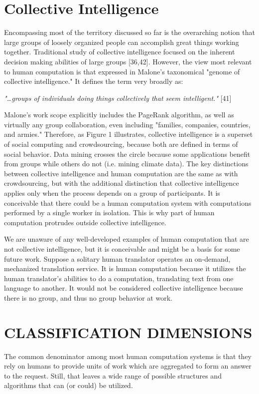 \documentclass{acm_proc_article-sp}
\begin{document}
\section*{Collective Intelligence}
Encompassing most of the territory discussed so far is the overarching notion that large groups of loosely organized people can accomplish great things working together. Traditional study of collective intelligence focused on the inherent decision making abilities of large groups [36,42]. However, the view most relevant to human computation is that expressed in Malone’s taxonomical "genome of collective intelligence." It defines the term very broadly as:

\textit{"\dots groups of individuals doing things collectively that seem intelligent."} [41]

Malone's work scope explicitly includes the PageRank algorithm, as well as virtually any group collaboration, even including "families, companies, countries, and armies." Therefore, as Figure 1 illustrates, collective intelligence is a superset of social computing and crowdsourcing, because both are defined in terms of social behavior. Data mining crosses the circle because some applications benefit from groups while others do not (i.e. mining climate data).
The key distinctions between collective intelligence and human computation are the same as with crowdsourcing, but with the additional distinction that collective intelligence applies only when the process depends on a group of participants. It is conceivable that there could be a human computation system with computations performed by a single worker in isolation. This is why part of human computation protrudes outside collective intelligence.

We are unaware of any well-developed examples of human computation that are not collective intelligence, but it is conceivable and might be a basis for some future work. Suppose a solitary human translator operates an on-demand, mechanized translation service. It is human computation because it utilizes the human translator’s abilities to do a computation, translating text from one language to another. It would not be considered collective intelligence because there is no group, and thus no group behavior at work.
\section*{CLASSIFICATION DIMENSIONS}
The common denominator among most human computation systems is that they rely on humans to provide units of work which are aggregated to form an answer to the request. Still, that leaves a wide range of possible structures and algorithms that can (or could) be utilized.
\end{document}

